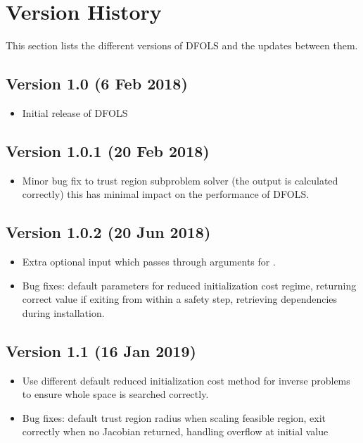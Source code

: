 \documentclass[letterpaper,10pt,english]{sphinxmanual}
\begin{document}
\chapter{Version History}
\label{\detokenize{history:version-history}}\label{\detokenize{history::doc}}
This section lists the different versions of DFO\sphinxhyphen{}LS and the updates between them.


\section{Version 1.0 (6 Feb 2018)}
\label{\detokenize{history:version-1-0-6-feb-2018}}\begin{itemize}
\item {} 
Initial release of DFO\sphinxhyphen{}LS

\end{itemize}


\section{Version 1.0.1 (20 Feb 2018)}
\label{\detokenize{history:version-1-0-1-20-feb-2018}}\begin{itemize}
\item {} 
Minor bug fix to trust region subproblem solver (the output  is calculated correctly) \sphinxhyphen{} this has minimal impact on the performance of DFO\sphinxhyphen{}LS.

\end{itemize}


\section{Version 1.0.2 (20 Jun 2018)}
\label{\detokenize{history:version-1-0-2-20-jun-2018}}\begin{itemize}
\item {} 
Extra optional input  which passes through arguments for .

\item {} 
Bug fixes: default parameters for reduced initialization cost regime, returning correct value if exiting from within a safety step, retrieving dependencies during installation.

\end{itemize}


\section{Version 1.1 (16 Jan 2019)}
\label{\detokenize{history:version-1-1-16-jan-2019}}\begin{itemize}
\item {} 
Use different default reduced initialization cost method for inverse problems to ensure whole space is searched correctly.

\item {} 
Bug fixes: default trust region radius when scaling feasible region, exit correctly when no Jacobian returned, handling overflow at initial value

\end{itemize}
\end{document}

